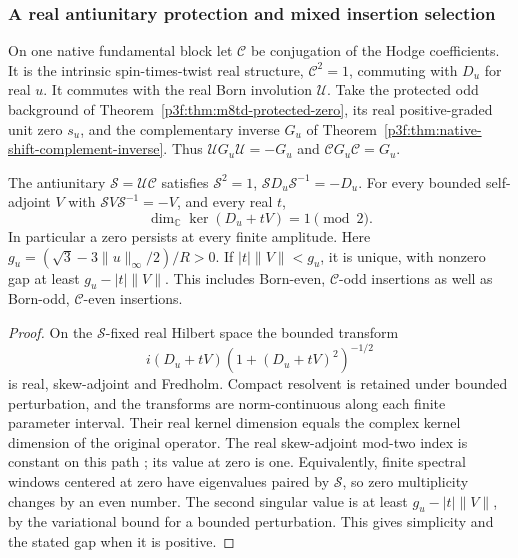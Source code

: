 \documentclass[11pt,a4paper]{article}
\begin{document}
\subsubsection{A real antiunitary protection and mixed insertion selection}
\label{p3f:sec:native-source-antiunitary-response}

On one native fundamental block let \(\mathcal C\) be conjugation of
the Hodge coefficients. It is the intrinsic spin-times-twist real
structure, \(\mathcal C^2=1\), commuting with \(D_u\) for real \(u\).
It commutes with the real Born involution \(\mathcal U\).
Take the protected odd background of
Theorem~\ref{p3f:thm:m8td-protected-zero}, its real positive-graded
unit zero \(s_u\), and the complementary inverse \(G_u\) of
Theorem~\ref{p3f:thm:native-shift-complement-inverse}.
Thus \(\mathcal UG_u\mathcal U=-G_u\) and
\(\mathcal CG_u\mathcal C=G_u\).

\begin{theorem}
\label{p3f:thm:native-source-product-protection}
The antiunitary \(\mathcal S=\mathcal U\mathcal C\) satisfies
\(\mathcal S^2=1\), \(\mathcal SD_u\mathcal S^{-1}=-D_u\).
For every bounded self-adjoint \(V\) with
\(\mathcal SV\mathcal S^{-1}=-V\), and every real \(t\),
\begin{equation}
 \dim_{\mathbb C}\ker(D_u+tV)=1\pmod2.
 \label{p3f:eq:native-source-product-mod2}
\end{equation}
In particular a zero persists at every finite amplitude. Here \(g_u=(\sqrt3-3\lVert u\rVert_\infty/2)/R>0\). If
\(|t|\|V\|<g_u\), it is unique, with nonzero gap at least
\(g_u-|t|\|V\|\). This includes Born-even, \(\mathcal C\)-odd
insertions as well as Born-odd, \(\mathcal C\)-even insertions.
\end{theorem}
\begin{proof}
On the \(\mathcal S\)-fixed real Hilbert space the bounded transform
\[
 i(D_u+tV)(1+(D_u+tV)^2)^{-1/2}
\]
is real, skew-adjoint and Fredholm. Compact resolvent is retained under
bounded perturbation, and the transforms are norm-continuous along
each finite parameter interval. Their real kernel dimension equals the
complex kernel dimension of the original operator. The real
skew-adjoint mod-two index is constant on this path
\cite{NativeSourceAtiyahSinger1969}; its value at zero is one.
Equivalently, finite spectral windows centered at zero have eigenvalues
paired by \(\mathcal S\), so zero multiplicity changes by an even number.
The second singular value is at least \(g_u-|t|\|V\|\), by the
variational bound for a bounded perturbation. This gives simplicity
and the stated gap when it is positive.
\end{proof}
\end{document}
